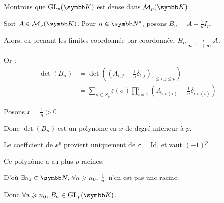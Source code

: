 \begin{exemple}
    Montrons que $\operatorname{GL}_p(\K)$ est dense dans $\mathcal M_p(\K)$.

    Soit $A \in \mathcal M_p(\K)$.
    Pour $n \in \N^*$, posons $B_n = A - \frac 1 n I_p$.

    Alors, en prenant les limites coordonnée par coordonnée, $B_n \underset{n \to + {+ \infty}}{\longrightarrow} A$.

    Or :
    \begin{align*}
        \det(B_n) & = \det\left(\left(A_{i, j} - \frac 1 n \delta_{i, j}\right)_{1 \leqslant i, j \leqslant p}\right) \\
        & = \sum_{ \sigma \in S_p} \varepsilon(\sigma) \prod_{i=1}^p \left(A_{i, \sigma(i)} - \frac 1 n \delta_{i, \sigma(i)}\right) 
    \end{align*}

    Posons $x = \frac 1 n > 0$. 

    Donc $\det(B_n) $ est un polynôme en $x$ de degré inférieur à $p$. 

    Le coefficient de $x^p$ provient uniquement de $\sigma = \text{Id}$, et vaut $(-1)^p$.

    Ce polynôme a au plus $p$ racines. 

    D'où $\exists n_0 \in \N, \, \forall n \geqslant n_0, \, \frac 1 n$ n'en est pas une racine. 

    Donc $\forall n \geqslant n_0, \, B_n \in \operatorname{GL}_p(\K)$. \\
\end{exemple}

